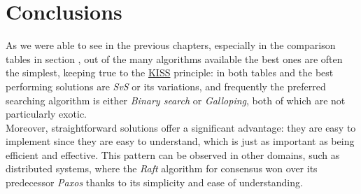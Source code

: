 \chapter{Conclusions\label{conclusions}}

As we were able to see in the previous chapters, especially in the comparison tables in section , out of the many algorithms available the best ones are often the simplest, keeping true to the \href{https://en.wikipedia.org/wiki/KISS_principle}{KISS} principle: in both tables  and  the best performing solutions are \textit{SvS} or its variations, and frequently the preferred searching algorithm is either \textit{Binary search} or \textit{Galloping}, both of which are not particularly exotic. \\
Moreover, straightforward solutions offer a significant advantage: they are easy to implement since they are easy to understand, which is just as important as being efficient and effective. This pattern can be observed in other domains, such as distributed systems, where the \textit{Raft} algorithm for consensus \citep{raft} won over its predecessor \textit{Paxos} \citep{paxos} thanks to its simplicity and ease of understanding. 

